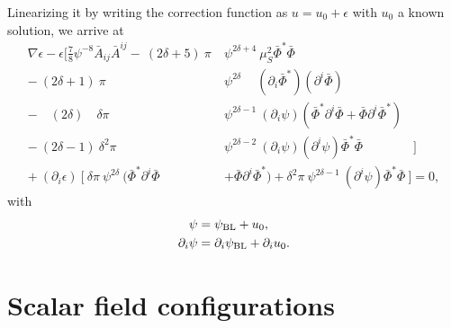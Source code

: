 Linearizing it by writing the correction function as $u = u_0 + \epsilon$ with $u_0$ a known solution,
we arrive at
\begin{align}
    \nabla\epsilon
    - \epsilon
    \Bigg[
        \frac{7}{8} \psi^{-8} \bar{A}_{ij} \bar{A}^{ij}
        -\
        (2\delta + 5)\ \pi\
        &\psi^{2\delta + 4}\
        \mu_S^2 \bar{\Phi}^* \bar{\Phi}
        \nonumber
        \\
        -\ (2\delta + 1)\ \pi\
        &\psi^{2\delta}\quad\ 
        (\partial_i\bar{\Phi}^*)
        (\partial^i\bar{\Phi})
        \nonumber
        \\
        -\quad (2\delta)\quad \delta \pi\
        &\psi^{2\delta-1}\ (\partial_i\psi)
        ( \bar{\Phi}^* \partial^i\bar{\Phi}
        + \bar{\Phi} \partial^i\bar{\Phi}^* )
        \nonumber
        \\
        -\ (2\delta-1)\ \delta^2 \pi\
        &\psi^{2\delta-2}\ (\partial_i\psi) (\partial^i\psi)
        \bar{\Phi}^* \bar{\Phi}
    \quad\quad\quad\quad\Big]
    \nonumber
    \\
    +\
    (\partial_i\epsilon)\
    \Big[\
        \delta \pi\ \psi^{2\delta}\
        ( \bar{\Phi}^* \partial^i\bar{\Phi}
        &+ \bar{\Phi} \partial^i\bar{\Phi}^* )
        +
        \delta^2 \pi\ \psi^{2\delta-1}\ (\partial^i\psi)
        \bar{\Phi}^* \bar{\Phi}
    \
    \Big]= 0,
\end{align}
with
\begin{align}
    \psi
    &= \psi_{\rm BL} + u_0,
    \\
    \partial_i \psi
    &= \partial_i \psi_{\rm BL}
    + \partial_i u_0.
\end{align}


\section{Scalar field configurations}


